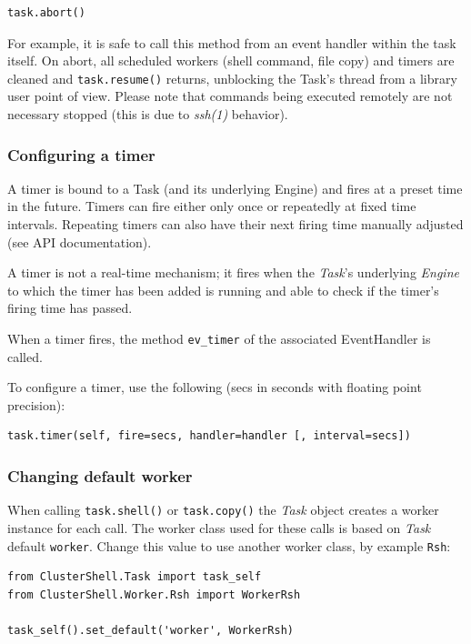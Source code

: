 \documentclass[english,a4paper]{csuserguide}
\newcommand{\Task}{\textit{Task}\xspace}
\newcommand{\Engine}{\textit{Engine}\xspace}
\begin{document}
\begin{lstlisting}[breaklines=true, breakatwhitespace=true]
task.abort()
\end{lstlisting}

For example, it is safe to call this method from an event handler within the task itself. On abort, all scheduled workers (shell command, file copy) and timers are cleaned and \lstinline+task.resume()+ returns, unblocking the Task's thread from a library user point of view. Please note that commands being executed remotely are not necessary stopped (this is due to \textit{ssh(1)} behavior).

\subsubsection{Configuring a timer}

A timer is bound to a Task (and its underlying Engine) and fires at a preset time in the future. Timers can fire either only once or repeatedly at fixed time intervals. Repeating timers can also have their next firing time manually adjusted (see API documentation).

A timer is not a real-time mechanism; it fires when the \Task's underlying \Engine to which the timer has been added is running and able to check if the timer's firing time has passed.

When a timer fires, the method \lstinline+ev_timer+ of the associated EventHandler is called.

To configure a timer, use the following (secs in seconds with floating point precision):
\medskip
\begin{lstlisting}[breaklines=true, breakatwhitespace=true]
task.timer(self, fire=secs, handler=handler [, interval=secs])
\end{lstlisting}

\subsubsection{Changing default worker}

When calling \lstinline+task.shell()+ or \lstinline+task.copy()+ the \Task object creates a worker instance for each call. The worker class used for these calls is based on \Task default \verb+worker+. Change this value to use another worker class, by example \lstinline+Rsh+:
\medskip
\begin{lstlisting}[breaklines=true, breakatwhitespace=true]
from ClusterShell.Task import task_self
from ClusterShell.Worker.Rsh import WorkerRsh

task_self().set_default('worker', WorkerRsh)
\end{lstlisting}
\end{document}
